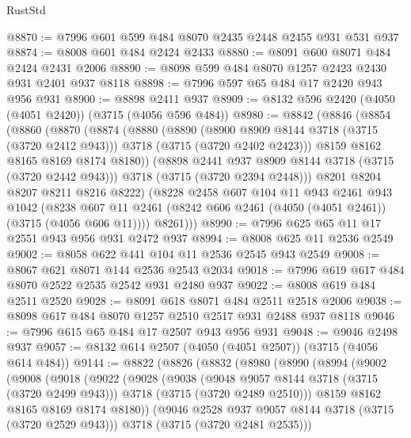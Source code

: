 \begin{lexlean}{RustStd}
\begin{coremodule}
@8870 := @7996 @601 @599 @484 @8070 @2435 @2448 @2455 @931 @531 @937
@8874 := @8008 @601 @484 @2424 @2433
@8880 := @8091 @600 @8071 @484 @2424 @2431 @2006
@8890 := @8098 @599 @484 @8070 @1257 @2423 @2430 @931 @2401 @937 @8118
@8898 := @7996 @597 @65 @484 @17 @2420 @943 @956 @931
@8900 := @8898 @2411 @937
@8909 := @8132 @596 @2420 (@4050 (@4051 @2420)) (@3715 (@4056 @596 @484))
@8980 := @8842
    (@8846
      (@8854
        (@8860
          (@8870
            (@8874
              (@8880
                (@8890
                  (@8900 @8909 @8144 @3718 (@3715 (@3720 @2412 @943)))
                  @3718
                  (@3715 (@3720 @2402 @2423)))
                @8159
                @8162
                @8165
                @8169
                @8174
                @8180))
            (@8898 @2441 @937 @8909 @8144 @3718 (@3715 (@3720 @2442 @943)))
            @3718
            (@3715 (@3720 @2394 @2448)))
          @8201
          @8204
          @8207
          @8211
          @8216
          @8222)
        (@8228
          @2458
          @607
          @104
          @11
          @943
          @2461
          @943
          @1042
          (@8238 @607 @11 @2461 (@8242 @606 @2461 (@4050 (@4051 @2461)) (@3715 (@4056 @606 @11))))
          @8261)))
@8990 := @7996 @625 @65 @11 @17 @2551 @943 @956 @931 @2472 @937
@8994 := @8008 @625 @11 @2536 @2549
@9002 := @8058 @622 @441 @104 @11 @2536 @2545 @943 @2549
@9008 := @8067 @621 @8071 @144 @2536 @2543 @2034
@9018 := @7996 @619 @617 @484 @8070 @2522 @2535 @2542 @931 @2480 @937
@9022 := @8008 @619 @484 @2511 @2520
@9028 := @8091 @618 @8071 @484 @2511 @2518 @2006
@9038 := @8098 @617 @484 @8070 @1257 @2510 @2517 @931 @2488 @937 @8118
@9046 := @7996 @615 @65 @484 @17 @2507 @943 @956 @931
@9048 := @9046 @2498 @937
@9057 := @8132 @614 @2507 (@4050 (@4051 @2507)) (@3715 (@4056 @614 @484))
@9144 := @8822
    (@8826
      (@8832
        (@8980
          (@8990
            (@8994
              (@9002
                (@9008
                  (@9018
                    (@9022
                      (@9028
                        (@9038
                          (@9048 @9057 @8144 @3718 (@3715 (@3720 @2499 @943)))
                          @3718
                          (@3715 (@3720 @2489 @2510)))
                        @8159
                        @8162
                        @8165
                        @8169
                        @8174
                        @8180))
                    (@9046 @2528 @937 @9057 @8144 @3718 (@3715 (@3720 @2529 @943)))
                    @3718
                    (@3715 (@3720 @2481 @2535)))

\end{coremodule}
\end{lexlean}
